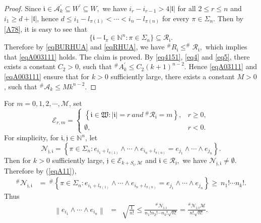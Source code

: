\documentclass[11pt]{article}
\theoremstyle{plain}
\theoremstyle{definition}
\begin{document}
{\begin{proof}
Since $\mathfrak{i} \in \mathcal{A}_{k}^{\prime}\subseteq W^{\prime}\subseteq W,$ we have $i_r- i_{r-1}> 4 |\mathfrak{l}|$ for all $2\leq r\leq n$ and $i_1\geq d+|\mathfrak{l}|$, hence
$d\leq i_1-l_{\pi(1)}<\cdots<i_n-l_{\pi(n)}$ for every $\pi \in \Sigma_n.$
Then by \eqref{A78}, it is easy to see that
\begin{equation}\label{eqRHUA}\{\mathfrak{i}-\mathfrak{l}_{\pi} \in \mathbb N^n: \pi \in \Sigma_n\} \subseteq \mathcal{R}_{\mathfrak{i}}.\end{equation}
Therefore by \eqref{eqBURHUA} and \eqref{eqRHUA}, we have $ ^{\#  }	R_{\mathfrak{i}  } \leq
 ^{\#  }	\mathcal{R}_{\mathfrak{i}  },$ which implies that \eqref{eqA003111} holds.
The claim is proved.
By \eqref{eq4151}, \eqref{eq4} and \eqref{eq5}, there exists a constant $C_2>0$, such that $^{\#  }A_{k}^{\prime}\leq C_2\left ( k+1 \right ) ^{n-2}.$ Hence 
\eqref{eqA03111} and \eqref{eqA003111} ensure that for $k> 0$ sufficiently large, there exists a constant $M>0$, such that $^{\#  }\mathcal{A}_{k} \le Mk^{n-2}$.
\end{proof}
For $m=0,1,2,\cdots ,\mathscr{M}$, set
\begin{equation}\label{eqA3}
	\mathcal{E}_{r,m} = \begin{cases}
		\left \{ \mathfrak{i}\in \mathfrak{W} :\left | \mathfrak{i}  \right |=r \ and \   ^{\#  } \mathcal{R}_{\mathfrak{i}  }  =m   \right \},& r \geq 0, \\
		\emptyset,& r < 0.
	\end{cases}
\end{equation}
For  simplicity, for $\mathfrak{i},\mathfrak{j}\in \mathbb N^n$, let
\begin{equation}\label{eqA11}
	\mathcal{N}_{\mathfrak{j}, \mathfrak{i}  }=\left \{ \pi\in\Sigma_{n}:e_{i_1+l_{\pi(1)}} \wedge \cdots \wedge e_{i_n+l_{\pi(n)}}=e_{j_1} \wedge \cdots \wedge e_{j_n} \right \}.
\end{equation}
		Then for $k> 0$ sufficiently large, $\mathfrak{j}  \in \mathcal{E}_{k+S_\mathfrak{l},\mathscr{M} } $ and	$\mathfrak{i} \in \mathcal{R}_{\mathfrak{j} },$
    we have $\mathcal{N}_{\mathfrak{j},\mathfrak{i} }  \neq \emptyset.$
	Therefore by (\ref{eqA11}),
	$$ \begin{aligned}
		^{\#  } \mathcal{N}_{\mathfrak{j},\mathfrak{i} }  &= \ ^{\#  } \left \{\pi \in \Sigma_{n}:e_{i_1+l_{\pi(1)}} \wedge \cdots \wedge e_{i_n+l_{\pi(n)}}=e_{j_1} \wedge \cdots \wedge e_{j_n} \right \}
		\ge \  n_{1}!\cdots n_{k}!.
	\end{aligned} $$
	Thus	
	\begin{eqnarray}\label{eqA34}
		\left \| e_{i_1} \wedge \cdots \wedge e_{i_n}  \right \|&=&\sqrt{\frac{1}{n!}}
		\leq\frac{ ^{\#  } \mathcal{N}_{\mathfrak{j},\mathfrak{i} }}{n_1!n_2!\cdots n_k!\sqrt{n!}}
		= \frac{^{\#  } \mathcal{N}_{\mathfrak{j},\mathfrak{i} }\mathscr{M}}{n!\sqrt{n!}}.
	\end{eqnarray}

}
\end{document}
